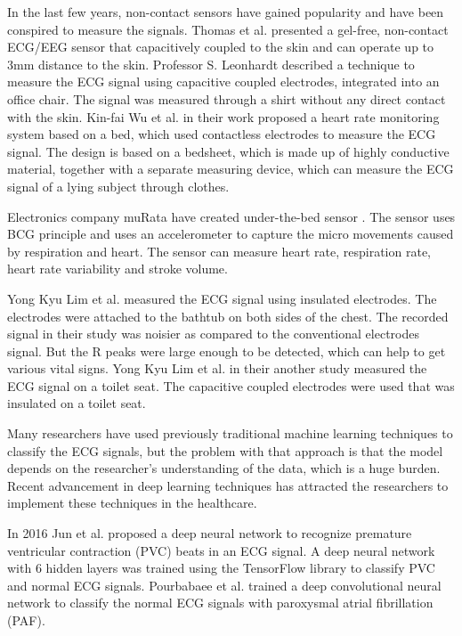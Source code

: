 In the last few years, non-contact sensors have gained popularity and have been conspired to measure the signals. Thomas et al. \cite{sullivan2007low} presented a gel-free, non-contact ECG/EEG sensor that capacitively coupled to the skin and can operate up to 3mm distance to the skin. Professor S. Leonhardt \cite{aleksandrowicz2007wireless} described a technique to measure the ECG signal using capacitive coupled electrodes, integrated into an office chair. The signal was measured through a shirt without any direct contact with the skin. Kin-fai Wu et al. \cite{wu2008contactless} in their work proposed a heart rate monitoring system based on a bed, which used contactless electrodes to measure the ECG signal. The design is based on a bedsheet, which is made up of highly conductive material, together with a separate measuring device, which can measure the ECG signal of a lying subject through clothes. 

Electronics company muRata have created under-the-bed sensor  \cite{muratabcg bed}. The sensor uses BCG principle and uses an accelerometer to capture the micro movements caused by respiration and heart. The sensor can measure heart rate, respiration rate, heart rate variability and stroke volume.

Yong Kyu Lim et al. \cite{lim2004ecg} measured the ECG signal using insulated electrodes. The electrodes were attached to the bathtub on both sides of the chest. The recorded signal in their study was noisier as compared to the conventional electrodes signal. But the R peaks were large enough to be detected, which can help to get various vital signs. Yong Kyu Lim et al. in their another study \cite{kim2004electrically} measured the ECG signal on a toilet seat. The capacitive coupled electrodes were used that was insulated on a toilet seat.

Many researchers have used previously traditional machine learning techniques to classify the ECG signals, but the problem with that approach is that the model depends on the researcher's understanding of the data, which is a huge burden. Recent advancement in deep learning techniques has attracted the researchers to implement these techniques in the healthcare.

In 2016 Jun et al. \cite{7838258} proposed a deep neural network to recognize premature ventricular contraction (PVC) beats in an ECG signal. A deep neural network with 6 hidden layers was trained using the TensorFlow library to classify PVC and normal ECG signals. Pourbabaee et al. \cite{7727866} trained a deep convolutional neural network to classify the normal ECG signals with paroxysmal atrial fibrillation (PAF).

